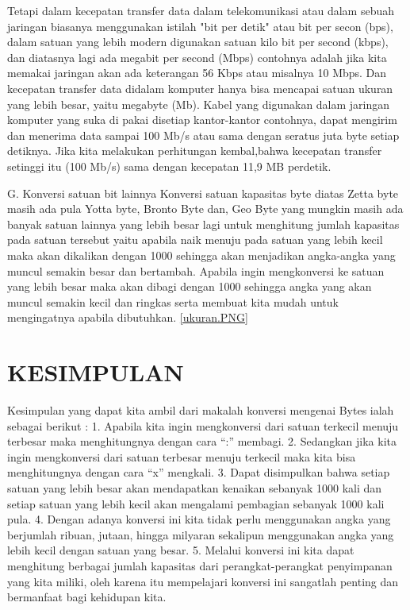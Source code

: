 Tetapi dalam kecepatan transfer data dalam telekomunikasi atau dalam sebuah jaringan biasanya menggunakan istilah "bit per detik" atau
bit per secon (bps), dalam satuan yang lebih modern digunakan satuan kilo bit per second (kbps), dan diatasnya lagi ada megabit per second (Mbps)
contohnya adalah jika kita memakai jaringan akan ada keterangan 56 Kbps atau misalnya 10 Mbps. Dan kecepatan transfer data didalam komputer hanya bisa mencapai satuan ukuran yang lebih besar, yaitu megabyte (Mb). Kabel yang digunakan dalam jaringan komputer yang suka di pakai disetiap kantor-kantor  contohnya, dapat mengirim dan menerima data sampai 100 Mb/s atau sama dengan seratus juta byte setiap detiknya. Jika kita melakukan perhitungan kembal,bahwa kecepatan transfer setinggi itu (100 Mb/s) sama dengan kecepatan 11,9 MB perdetik.

G. Konversi satuan bit lainnya
Konversi satuan kapasitas byte diatas Zetta byte masih ada pula Yotta byte, Bronto Byte dan, Geo Byte yang mungkin masih ada banyak satuan lainnya yang lebih besar lagi untuk menghitung jumlah kapasitas pada satuan tersebut yaitu apabila naik menuju pada satuan yang lebih kecil maka akan dikalikan dengan 1000 sehingga akan menjadikan angka-angka yang muncul semakin besar dan bertambah. 
Apabila ingin mengkonversi ke satuan yang lebih besar maka akan dibagi dengan 1000 sehingga angka yang akan muncul semakin kecil dan ringkas serta membuat kita mudah untuk mengingatnya apabila dibutuhkan.
\ref{ukuran.PNG}
\section {KESIMPULAN}
Kesimpulan yang dapat kita ambil dari makalah konversi mengenai Bytes ialah sebagai berikut :
1.	Apabila kita ingin mengkonversi dari satuan terkecil menuju terbesar maka menghitungnya dengan cara “:” membagi.
2.	Sedangkan jika kita ingin mengkonversi dari satuan terbesar menuju terkecil maka kita bisa menghitungnya dengan cara “x” mengkali.
3.	Dapat disimpulkan bahwa setiap satuan yang lebih besar akan mendapatkan kenaikan sebanyak 1000 kali dan setiap satuan yang lebih kecil akan mengalami pembagian sebanyak 1000 kali pula.
4.	Dengan adanya konversi ini kita tidak perlu menggunakan angka yang berjumlah ribuan, jutaan, hingga milyaran sekalipun menggunakan angka yang lebih kecil dengan satuan yang besar.
5.	Melalui konversi ini kita dapat menghitung berbagai jumlah kapasitas dari perangkat-perangkat penyimpanan yang kita miliki, oleh karena itu mempelajari konversi ini sangatlah penting dan bermanfaat bagi kehidupan kita. 

